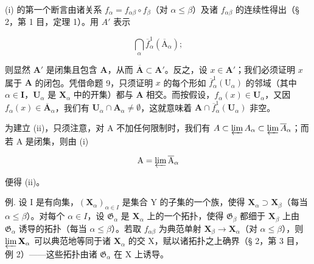 (i) 的第一个断言由诸关系 \(f_{\alpha} = f_{\alpha \beta} \circ f_{\beta}\)（对 \(\alpha \leqslant \beta\)）及诸 \(f_{\alpha \beta}\) 的连续性得出（§ 2，第 1 目，定理 1）。用 \(A'\) 表示

\[
\bigcap_ {\alpha} \overline {{f}} _ {\alpha} ^ {1} (\overline {{\mathrm{A}}} _ {\alpha});
\]

则显然 \(\mathbf{A}'\) 是闭集且包含 \(\mathbf{A}\)，从而 \(\overline{\mathbf{A}} \subset \mathbf{A}'\)。反之，设 \(x \in \mathbf{A}'\)；我们必须证明 \(x\) 属于 \(\mathbf{A}\) 的闭包。凭借命题 9，只须证明 \(x\) 的每个形如 \(\overline{f}_{\alpha}^{1}(\mathrm{U}_{\alpha})\) 的邻域（其中 \(\alpha \in \mathbf{I}\)，\(\mathbf{U}_{\alpha}\) 是 \(\mathbf{X}_{\alpha}\) 中的开集）都与 \(\mathbf{A}\) 相交。而按假设，\(f_{\alpha}(x) \in \mathbf{U}_{\alpha}\)，又因 \(f_{\alpha}(x) \in \overline{\mathbf{A}}_{\alpha}\)，我们有 \(\mathbf{U}_{\alpha} \cap \mathbf{A}_{\alpha} \neq \emptyset\)，这就意味着 \(\mathbf{A} \cap \overline{f}_{\alpha}^{1}(\mathbf{U}_{\alpha})\) 非空。

为建立 (ii)，只须注意，对 A 不加任何限制时，我们有 \(A \subset \varprojlim A_{\alpha} \subset \varprojlim \overline{A}_{\alpha}\)；而若 A 是闭集，则由 (i)

\[
\mathrm{A} = \varprojlim \overline {{\mathrm{A}}} _ {\alpha}
\]

便得 (ii)。

例. 设 I 是有向集，\((\mathbf{X}_{\alpha})_{\alpha \in I}\) 是集合 Y 的子集的一个族，使得 \(\mathbf{X}_{\alpha} \supset \mathbf{X}_{\beta}\)（每当 \(\alpha \leqslant \beta\)）。对每个 \(\alpha \in I\)，设 \(\mathfrak{G}_{\alpha}\) 是 \(\mathbf{X}_{\alpha}\) 上的一个拓扑，使得 \(\mathfrak{G}_{\beta}\) 都细于 \(\mathbf{X}_{\beta}\) 上由 \(\mathfrak{G}_{\alpha}\) 诱导的拓扑（每当 \(\alpha \leqslant \beta\)）。若取 \(f_{\alpha \beta}\) 为典范单射 \(\mathbf{X}_{\beta} \to \mathbf{X}_{\alpha}\)（对 \(\alpha \leqslant \beta\)），则 \(\varprojlim \mathbf{X}_{\alpha}\) 可以典范地等同于诸 \(\mathbf{X}_{\alpha}\) 的交 X，赋以诸拓扑之上确界（§ 2，第 3 目，例 2）——这些拓扑由诸 \(\mathfrak{G}_{\alpha}\) 在 X 上诱导。

